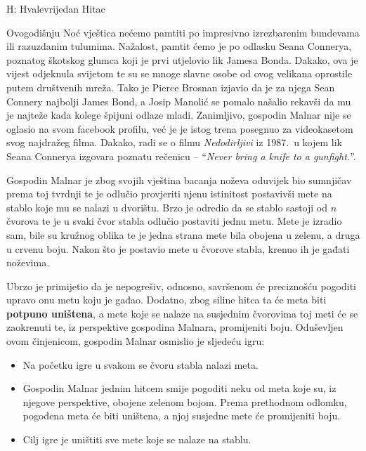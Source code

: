 \begin{statement}[
  timelimit=1 s,
  memorylimit=512 MiB,
]{H: Hvalevrijedan Hitac}

Ovogodišnju Noć vještica nećemo pamtiti po impresivno izrezbarenim bundevama
ili razuzdanim tulumima. Nažalost, pamtit ćemo je po odlasku Seana Connerya,
poznatog škotskog glumca koji je prvi utjelovio lik Jamesa Bonda.  Dakako,
ova je vijest odjeknula svijetom te su se mnoge slavne osobe od ovog velikana
oprostile putem društvenih mreža. Tako je Pierce Brosnan izjavio da je za
njega Sean Connery najbolji James Bond, a Josip Manolić se pomalo našalio
rekavši da mu je najteže kada kolege špijuni odlaze mladi.  Zanimljivo,
gospodin Malnar nije se oglasio na svom facebook profilu, već je je istog
trena posegnuo za videokasetom svog najdražeg filma. Dakako, radi se o filmu
\textit{Nedodirljivi} iz 1987.\ u kojem lik Seana Connerya izgovara poznatu
rečenicu -- ``\textit{Never bring a knife to a gunfight.}''.

Gospodin Malnar je zbog svojih vještina bacanja noževa oduvijek bio sumnjičav
prema toj tvrdnji te je odlučio provjeriti njenu istinitost postavivši
mete na stablo koje mu se nalazi u dvorištu. Brzo je odredio da se stablo
sastoji od $n$ čvorova te je u svaki čvor stabla odlučio postaviti jednu
metu. Mete je izradio sam, bile su kružnog oblika te je jedna strana mete bila
obojena u zelenu, a druga u crvenu boju. Nakon što je postavio mete u čvorove
stabla, krenuo ih je gađati noževima.

Ubrzo je primijetio da je nepogrešiv, odnosno, savršenom će preciznošću
pogoditi upravo onu metu koju je gađao. Dodatno, zbog siline hitca ta će meta
biti \textbf{potpuno uništena}, a mete koje se nalaze na susjednim čvorovima
toj meti će se zaokrenuti te, iz perspektive gospodina Malnara, promijeniti
boju. Oduševljen ovom činjenicom, gospodin Malnar osmislio je sljedeću igru:

\begin{itemize}
    \item Na početku igre u svakom se čvoru stabla nalazi meta.
    \item Gospodin Malnar jednim hitcem smije pogoditi neku od meta koje su,
          iz njegove perspektive, obojene zelenom bojom. Prema prethodnom
          odlomku, pogođena meta će biti uništena, a njoj susjedne mete će
          promijeniti boju.
    \item Cilj igre je uništiti sve mete koje se nalaze na stablu.
\end{itemize}


\end{statement}
